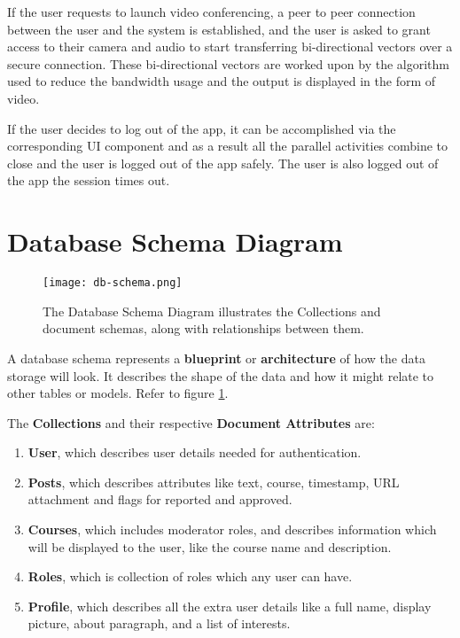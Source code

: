 If the user requests to launch video conferencing, a peer to peer connection between the user and 
the system is established, and the user is asked to grant access to their camera and audio to start transferring bi-directional vectors over a secure connection.
These bi-directional vectors are worked upon by the algorithm used to reduce the bandwidth usage and the output is displayed in the form of video.

If the user decides to log out of the app, it can be accomplished via the corresponding UI component and as a result all the 
parallel activities combine to close and the user is logged out of the app safely.
The user is also logged out of the app the session times out.

\section{Database Schema Diagram}

\begin{figure}[h!]
    \centering
    \texttt{[image: db-schema.png]}
    \caption{The Database Schema Diagram illustrates the Collections and document schemas, 
    along with relationships between them.}
    \label{fig:schema}
\end{figure}

A database schema represents a \textbf{blueprint} or \textbf{architecture} of how the data storage will look. 
It describes the shape of the data and how it might relate to other tables or models. Refer to figure \ref{fig:schema}.

The \textbf{Collections} and their respective \textbf{Document Attributes} are:
\begin{enumerate}
    \item \textbf{User}, which describes user details needed for authentication.
    \item \textbf{Posts}, which describes attributes like text, course, timestamp, URL attachment 
    and flags for reported and approved.
    \item \textbf{Courses}, which includes moderator roles, and describes information which will 
    be displayed to the user, like the course name and description.
    \item \textbf{Roles}, which is collection of roles which any user can have.
    \item \textbf{Profile}, which describes all the extra user details like a full name, display picture, about paragraph, and a list of interests.
\end{enumerate}


